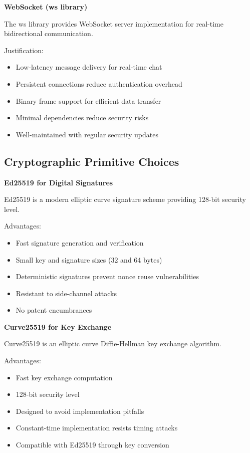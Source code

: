 \textbf{WebSocket (ws library)}

The ws library provides WebSocket server implementation for real-time bidirectional communication.

Justification:
\begin{itemize}
    \item Low-latency message delivery for real-time chat
    \item Persistent connections reduce authentication overhead
    \item Binary frame support for efficient data transfer
    \item Minimal dependencies reduce security risks
    \item Well-maintained with regular security updates
\end{itemize}

\subsection{Cryptographic Primitive Choices}

\textbf{Ed25519 for Digital Signatures}

Ed25519 is a modern elliptic curve signature scheme providing 128-bit security level.

Advantages:
\begin{itemize}
    \item Fast signature generation and verification
    \item Small key and signature sizes (32 and 64 bytes)
    \item Deterministic signatures prevent nonce reuse vulnerabilities
    \item Resistant to side-channel attacks
    \item No patent encumbrances
\end{itemize}

\textbf{Curve25519 for Key Exchange}

Curve25519 is an elliptic curve Diffie-Hellman key exchange algorithm.

Advantages:
\begin{itemize}
    \item Fast key exchange computation
    \item 128-bit security level
    \item Designed to avoid implementation pitfalls
    \item Constant-time implementation resists timing attacks
    \item Compatible with Ed25519 through key conversion
\end{itemize}

